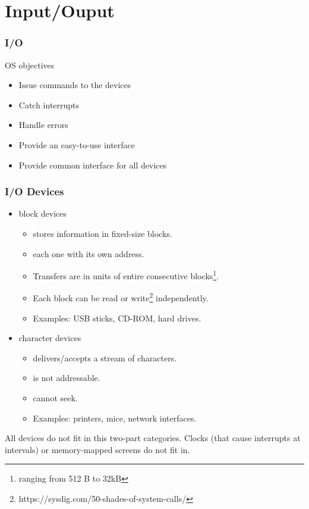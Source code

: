 \section{Input/Ouput}

\begin{frame}
  \frametitle{I/O}
  \begin{block}{OS objectives}
    \begin{itemize}
      \item Issue commands to the devices
      \item Catch interrupts
      \item Handle errors
      \item Provide an easy-to-use interface
      \item Provide common interface for all devices
    \end{itemize}
  \end{block}
\end{frame}

\begin{frame}
  \frametitle{I/O Devices}
  \begin{itemize}
    \item block devices
    \begin{itemize}
      \item stores information in fixed-size blocks.
      \item each one with its own address.
      \item Transfers are in units of entire consecutive blocks\footnote{ranging from 512 B to 32kB}.
      \item Each block can be read or write\footnote{https://sysdig.com/50-shades-of-system-calls/} independently.
      \item Examples: USB sticks, CD-ROM, hard drives.
    \end{itemize}
    \item character devices
    \begin{itemize}
      \item delivers/accepts a stream of characters.
      \item is not addressable.
      \item cannot seek.
      \item Examples: printers, mice, network interfaces.
    \end{itemize}
  \end{itemize}
  All devices do not fit in this two-part categories. Clocks (that cause interrupts at intervals) or memory-mapped screens do not fit in.
\end{frame}

